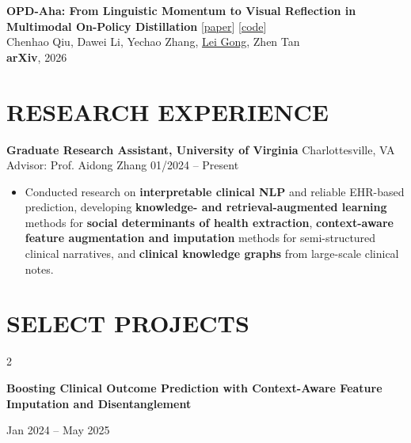 \documentclass[10pt, letterpaper]{article}
\newenvironment{twocolentry}[2][]{
    \onecolentry
    \def\secondColumn{#2}
    \setcolumnwidth{\fill, 4.5 cm}
    \begin{paracol}{2}
}{
    \switchcolumn \raggedleft \secondColumn
    \end{paracol}
    \endonecolentry
} %
\begin{document}
\begin{enumerate}[label={[\arabic*]}]
            \item \textbf{OPD-Aha: From Linguistic Momentum to Visual Reflection in Multimodal On-Policy Distillation} [\href{https://arxiv.org/abs/2609.16459}{paper}] [\href{https://github.com/Echochef/OPD-Aha}{code}] \\
            Chenhao Qiu, Dawei Li, Yechao Zhang, \underline{Lei Gong}, Zhen Tan\\
            \textbf{arXiv}, 2026
                    
        \end{enumerate}

        \section{RESEARCH EXPERIENCE}
        \textbf{Graduate Research Assistant, University of Virginia} \hfill Charlottesville, VA \\
Advisor: Prof. Aidong Zhang \hfill 01/2024 -- Present
\begin{itemize}
    \item Conducted research on \textbf{interpretable clinical NLP} and reliable EHR-based prediction, developing \textbf{knowledge- and retrieval-augmented learning} methods for \textbf{social determinants of health extraction}, \textbf{context-aware feature augmentation and imputation} methods for semi-structured clinical narratives, and \textbf{clinical knowledge graphs} from large-scale clinical notes.
\end{itemize}
        
\section{SELECT PROJECTS}

\begin{twocolentry}{
    Jan 2024 -- May 2025
}
    \textbf{Boosting Clinical Outcome Prediction with Context-Aware Feature Imputation and Disentanglement}
\end{twocolentry}
\end{document}
